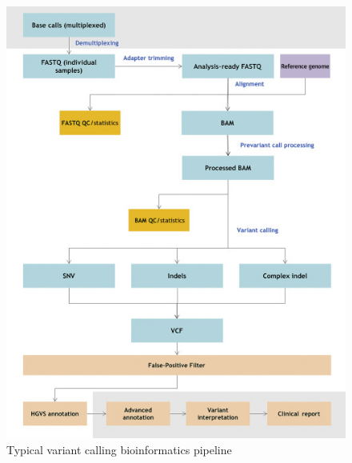 \documentclass[12pt]{article}
\begin{document}
\begin{itemize}
\begin{enumerate}
                    \begin{figure}[h!]
                        \centering
                        \includegraphics[scale=1.0]{./figuras/ngs_pipeline}
                        \caption{Typical variant calling bioinformatics pipeline}
                        \label{fig:pipeline_2}
                    \end{figure}


\end{enumerate}
\end{itemize}
\end{document}
